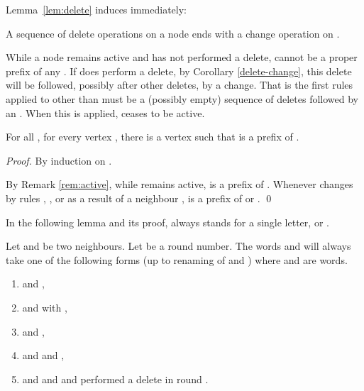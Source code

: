 \documentclass[11pt,envcountsame,letterpaper]{llncs}
\begin{document}
Lemma~\ref{lem:delete} induces immediately:
\begin{corollary}\label{delete-change}
A sequence of delete operations on a node  ends with a 
change operation on .
\end{corollary}

\begin{remark}\label{rem:active}
While a node  remains active and has
not performed a delete,  cannot be a proper prefix of any .
If  does perform a delete, by Corollary \ref{delete-change}, this delete
will be followed, possibly after other deletes, by a change.
That is the first rules applied to  other than  must be a
(possibly empty) sequence of deletes followed by an . When this  is applied,
 ceases to be active.
\end{remark}


\begin{lemma}
\label{lem:prefix}
For all ,
for every vertex , there is a vertex  such that  is a prefix of
.
\end{lemma}


\begin{proof}
By induction on .

By Remark \ref{rem:active}, while  remains active,
 is a prefix of .
Whenever  changes by rules , ,  or  as a result 
of a neighbour ,  is a prefix of  or .
\qed
\end{proof} 

In the following lemma and its proof,  always stands for a single letter,
 or .
\begin{lemma}
\label{lem:voisins}
Let  and  be two neighbours. Let  be a round number.
The words  and 
will always take one of the following forms (up to renaming of  and )
where  and  are words.
\begin{enumerate}
\item  and ,
\item   and  with ,
\item   and ,
\item   and  and ,
\item  and  and  and  performed
a delete in round .
\end{enumerate}
\end{lemma}
\end{document}
